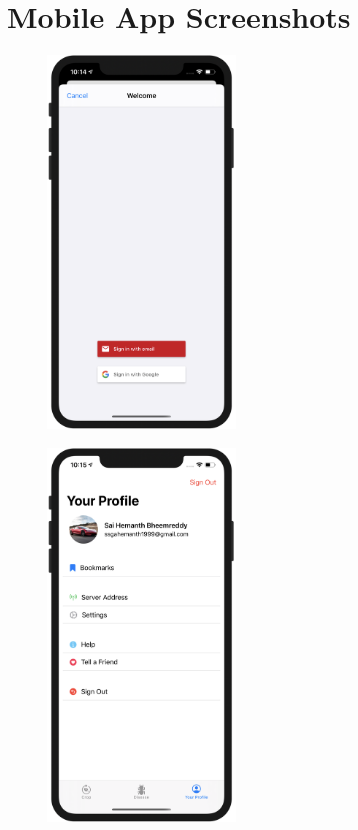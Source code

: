 \documentclass[../Report.tex]{subfiles}
\begin{document}
\section{Mobile App Screenshots}
\begin{figure}[H]
    \centering
    \begin{minipage}{.5\textwidth}
      \centering
      \includegraphics[width=5cm]{images/user_login.png}
      \label{fig:ss_user_login}
    \end{minipage}%
    \begin{minipage}{.5\textwidth}
      \centering
      \includegraphics[width=5cm]{images/profile.png}
      \label{fig:ss_user_profile}
    \end{minipage}
\end{figure}
\end{document}
